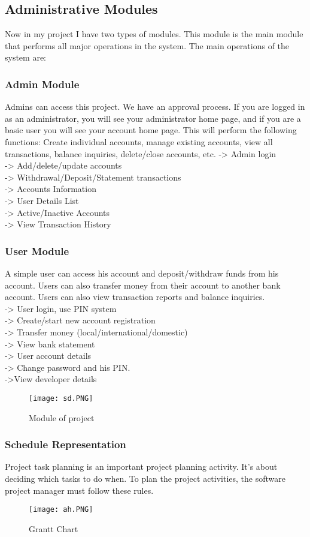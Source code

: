 \documentclass{article}
\begin{document}
\subsection{Administrative Modules}
Now in my project I have two types of modules. This module is the main module that performs all major operations in the system. The main operations of the system are:
\subsubsection{Admin Module }
Admins can access this project. We have an approval process. If you are logged in as an administrator, you will see your administrator home page, and if you are a basic user you will see your account home page. This will perform the following functions:
Create individual accounts, manage existing accounts, view all transactions, balance inquiries, delete/close accounts, etc.
-> Admin login\\ -> Add/delete/update accounts\\ -> Withdrawal/Deposit/Statement transactions\\ -> Accounts Information\\ -> User Details List\\ -> Active/Inactive Accounts\\ -> View Transaction History
\subsubsection{User Module }
A simple user can access his account and deposit/withdraw funds from his account. Users can also transfer money from their account to another bank account. Users can also view transaction reports and balance inquiries.
\\-> User login, use PIN system \\-> Create/start new account registration \\-> Transfer money (local/international/domestic)\\ -> View bank statement\\ -> User account details\\ -> Change password and his PIN.\\ ->View developer details
\begin{figure}[htp]
    \centering
    \texttt{[image: sd.PNG]}
    \caption{Module of project }
    \label{fig:Module of project }
\end{figure}
\newpage
\subsubsection{Schedule Representation}
Project task planning is an important project planning activity. It's about deciding which tasks to do when. To plan the project activities, the software project manager must follow these rules.
\begin{figure}[htp]
    \centering
    \texttt{[image: ah.PNG]}
    \caption{Grantt Chart }
    \label{fig:Grant Chart  }
\end{figure}
\\\\\\\
\end{document}
